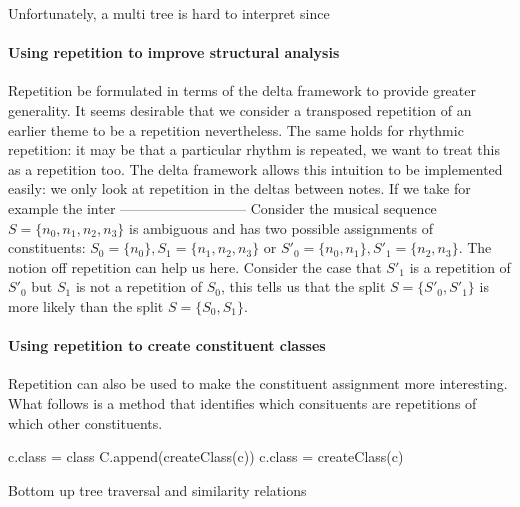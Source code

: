 \documentclass[a4paper,10pt]{article}
\begin{document}
Unfortunately, a multi tree is hard to interpret since 

\paragraph*{Using repetition to improve structural analysis}

Repetition be formulated in terms of the delta framework to provide greater generality. It seems desirable that we consider a transposed repetition of an earlier theme to be a repetition nevertheless. The same holds for rhythmic repetition: it may be that a particular rhythm is repeated, we want to treat this as a repetition too. The delta framework allows this intuition to be implemented easily: we only look at repetition in the deltas between notes. If we take for example the inter
---------------------------
Consider the musical sequence $S = \{n_0, n_1, n_2, n_3\}$ is ambiguous and has two possible assignments of constituents: $S_0 = \{n_0\}, S_1 = \{n_1, n_2, n_3\}$ or $S'_0 = \{n_0, n_1\}, S'_1 = \{n_2, n_3\}$. The notion off repetition can help us here. Consider the case that $S'_1$ is a repetition of $S'_0$ but $S_1$ is not a repetition of $S_0$, this tells us that the split $S = \{S'_0, S'_1\}$ is more likely than the split $S = \{S_0, S_1\}$.

\paragraph*{Using repetition to create constituent classes}

Repetition can also be used to make the constituent assignment more interesting. What follows is a method that identifies which consituents are repetitions of which other constituents.

\begin{algorithm}
\begin{algorithmic}
        \STATE c.class = class
      \ENDIF
    \ENDFOR
      \STATE C.append(createClass(c))
      \STATE c.class = createClass(c)
    \ENDIF
  \ENDFOR
\ENDFOR
\end{algorithmic}
\caption{Bottom up tree traversal and similarity relations}
\end{algorithm}
\end{document}
